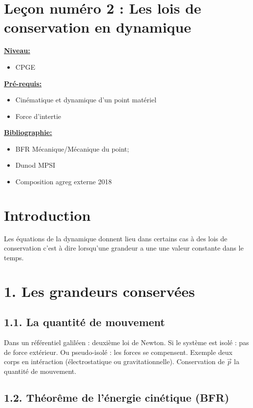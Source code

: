 \documentclass[french, a4paper, 10pt, twocolumn, landscape]{article}
\begin{document}
\section*{Leçon numéro 2 : Les lois de conservation en dynamique}



\noindent\underline{\textbf{Niveau:}}
\begin{itemize}
  \item CPGE 
\end{itemize}
\underline{\textbf{Pr{\'e}-requis: }}

\begin{itemize}  
  \item Cinématique et dynamique d'un point matériel
  \item Force d'intertie
\end{itemize}
\underline{\textbf{Bibliographie:}}

\begin{itemize}
  \item BFR Mécanique/Mécanique du point;
  \item Dunod MPSI
  \item Composition agreg externe 2018
\end{itemize}
\hrulefill


\section*{Introduction}

Les équations de la dynamique donnent lieu dans certains cas à des lois de conservation c'est à dire lorsqu'une grandeur a une une valeur constante dans le temps. 

\section*{1. Les grandeurs conservées}

\subsection*{1.1. La quantité de mouvement}

Dans un référentiel galiléen : deuxième loi de Newton. Si le système est isolé : pas de force extérieur. Ou pseudo-isolé : les forces se compensent. Exemple deux corps en intéraction (électrostatique ou gravitationnelle). Conservation de $\vec{p}$ la quantité de mouvement.

\subsection*{1.2. Théorême de l'énergie cinétique (BFR)}
\end{document}
